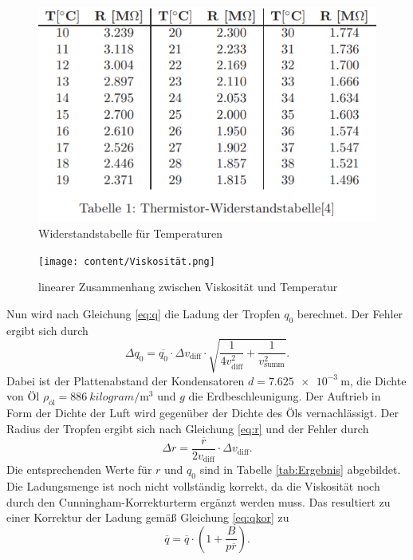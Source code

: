 \begin{figure}[H]
    \centering
    \includegraphics{content/Widerstand.png}
    \caption{Widerstandstabelle für Temperaturen}
    \label{fig:Wid}
  \end{figure}
  \begin{figure}[H]
    \centering
    \texttt{[image: content/Viskosität.png]}
    \caption{linearer Zusammenhang zwischen Viskosität und Temperatur}
    \label{fig:Vis}
  \end{figure}
Nun wird nach Gleichung \eqref{eq:q} die Ladung der Tropfen $q_0$ berechnet. Der Fehler ergibt sich durch
\begin{equation}
    \Delta q_0=\overline{q_0}\cdot \Delta v_\text{diff}\cdot \sqrt{\frac{1}{4v_\text{diff}^2}+\frac{1}{v_\text{summ}^2}}.
\end{equation}
Dabei ist der Plattenabstand der Kondensatoren $d=\qty{7.625e-3}{\meter}$, die Dichte von Öl 
$\rho_\text{öl}=\qty{886}{kilogram\per\meter\cubed}$ und $g$ die Erdbeschleunigung. Der Auftrieb in Form der Dichte der Luft
wird gegenüber der Dichte des Öls vernachlässigt.
Der Radius der Tropfen ergibt sich nach Gleichung \eqref{eq:r} und der Fehler durch
\begin{equation}
    \Delta r=\frac{\overline{r}}{2v_\text{diff}}\cdot \Delta v_\text{diff}.
\end{equation}
Die entsprechenden Werte für $r$ und $q_0$ sind in Tabelle \ref{tab:Ergebnis} abgebildet.
Die Ladungsmenge ist noch nicht vollständig korrekt, da die Viskosität noch durch den Cunningham-Korrekturterm
ergänzt werden muss. Das resultiert zu einer Korrektur der Ladung gemäß Gleichung \eqref{eq:qkor} zu
\begin{equation}
    \overline{q}=\overline{q}\cdot (1+\frac{B}{p\overline{r}}).
\end{equation}
